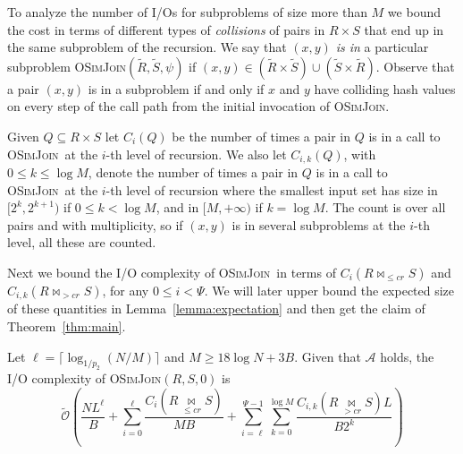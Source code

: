 \documentclass{llncs}
\newcommand{\Osymbol}{{\mathcal O}}
\newcommand{\TO}[1]{\tilde{\Osymbol}\left(#1\right)}
\newcommand{\SimJoin}{\textsc{OSimJoin}}
\begin{document}
To analyze the number of I/Os for subproblems of size more than $M$ we bound the cost in terms of different types of \emph{collisions} of pairs in $R\times S$ that end up in the same subproblem of the recursion. 
We say that $(x,y)$ \emph{is in} a particular subproblem \SimJoin$(\tilde{R},\tilde{S}, \psi)$ if $(x,y)\in (\tilde{R}\times \tilde{S}) \cup (\tilde{S}\times \tilde{R})$. 
Observe that a pair $(x,y)$ is in a subproblem if and only if $x$ and $y$ have colliding hash values on every step of the call path from the initial invocation of \SimJoin.

\newcommand{\C}[2][i]{C_{#1}\left({#2} \right)}
\begin{definition}

Given $Q\subseteq R\times S$ let $\C{Q}$ be the number of times a pair in $Q$ is in a call to \SimJoin\ at the $i$-th level of recursion. 
We also let $\C[i,k]{Q}$, with $0\leq k \leq \log M$, denote the number of times a pair in $Q$ is in a call to \SimJoin\ at the $i$-th level of recursion where the smallest input set has size in $[2^k, 2^{k+1})$ if $0\leq k <\log M$, and in $[M, +\infty)$ if $k = \log M$. 
The count is over all pairs and with multiplicity, so if $(x,y)$ is in several subproblems at the $i$-th level, all these are counted.

\end{definition}

Next we bound the I/O complexity of \SimJoin\ in terms of $\C{R \bowtie_{\leq cr} S}$ and $\C[i,k]{R \bowtie_{> cr} S}$, for any $0\leq i < \Psi$. 
We will later upper bound the expected size of these quantities in Lemma~\ref{lemma:expectation} and then get the claim of Theorem~\ref{thm:main}. 

\begin{lemma}\label{lem:collision-bound}

Let $\ell=\lceil \log_{1/p_2} (N/M)\rceil$ and $M\geq 18\log N + 3B$. Given that $\mathcal A$ holds,  the I/O complexity of \SimJoin$(R,S,0)$ is
\[
\TO{\frac{NL^{\ell}}{B}+ \sum_{i=0}^\ell \frac{\C{R \underset{\leq
cr}{\bowtie} S}}{MB}  + \sum_{i=\ell}^{\Psi-1}\sum_{k=0}^{\log
M}\frac{\C[i,k]{ R
\underset{> cr}{\bowtie}  S} L }{B 2^k}}\]

\end{lemma}
\end{document}

